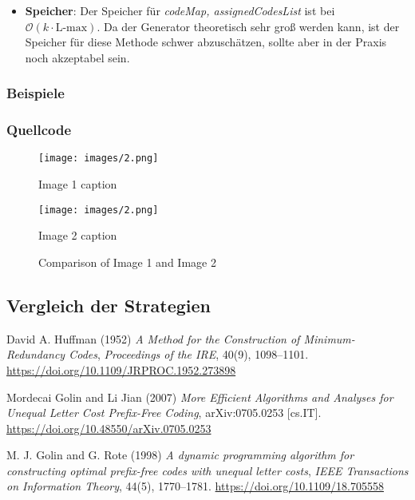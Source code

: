 \documentclass[a4paper,10pt,ngerman]{scrartcl}
\begin{document}
\begin{itemize}
\begin{itemize}
    \item \textbf{Speicher}:
    Der Speicher für \textit{codeMap, assignedCodesList} ist bei $\mathcal{O}(k\cdot \text{L-max})$. Da der Generator theoretisch sehr groß werden kann, ist der Speicher für diese Methode schwer abzuschätzen, sollte aber in der Praxis noch akzeptabel sein.
  \end{itemize}

\end{itemize}
\subsubsection{Beispiele}

\subsubsection{Quellcode}

\begin{figure}[htbp]
  \centering
  \begin{minipage}[b]{0.45\textwidth}
    \centering
    \texttt{[image: images/2.png]}
    \caption*{Image 1 caption} %
  \end{minipage}
  \hfill
  \begin{minipage}[b]{0.45\textwidth}
    \centering
    \texttt{[image: images/2.png]}
    \caption*{Image 2 caption}
  \end{minipage}
  \caption{Comparison of Image 1 and Image 2}
  \label{fig:comparison2}
\end{figure}

\subsection{Vergleich der Strategien}

\begin{thebibliography}{9}
David A. Huffman (1952) \emph{A Method for the Construction of Minimum-Redundancy Codes}, 
\emph{Proceedings of the IRE}, 40(9), 1098--1101. 
\url{https://doi.org/10.1109/JRPROC.1952.273898}

Mordecai Golin and Li Jian (2007) \emph{More Efficient Algorithms and Analyses for Unequal Letter Cost Prefix-Free Coding}, 
arXiv:0705.0253 [cs.IT]. \url{https://doi.org/10.48550/arXiv.0705.0253}

M. J. Golin and G. Rote (1998) \emph{A dynamic programming algorithm for constructing optimal prefix-free codes with unequal letter costs}, 
\emph{IEEE Transactions on Information Theory}, 44(5), 1770--1781. 
\url{https://doi.org/10.1109/18.705558}


\end{thebibliography}
\end{document}
